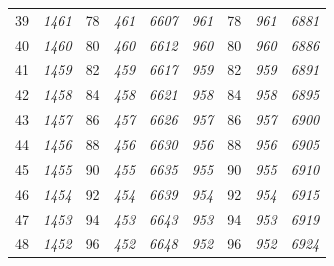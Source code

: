 \documentclass[10pt,fleqn]{article}
\begin{document}
\begin{longtable}{c|cccccccc}
39 & {\color{blue} \it 1461 \rm} & {\color{black} 78} & {\color{blue} \it 461 \rm} & {\color{blue} \it 6607 \rm} & {\color{blue} \it 961 \rm} & {\color{black} 78} & {\color{blue} \it 961 \rm} & {\color{blue} \it 6881 \rm} \\
40 & {\color{blue} \it 1460 \rm} & {\color{black} 80} & {\color{blue} \it 460 \rm} & {\color{blue} \it 6612 \rm} & {\color{blue} \it 960 \rm} & {\color{black} 80} & {\color{blue} \it 960 \rm} & {\color{blue} \it 6886 \rm} \\
41 & {\color{blue} \it 1459 \rm} & {\color{black} 82} & {\color{blue} \it 459 \rm} & {\color{blue} \it 6617 \rm} & {\color{blue} \it 959 \rm} & {\color{black} 82} & {\color{blue} \it 959 \rm} & {\color{blue} \it 6891 \rm} \\
42 & {\color{blue} \it 1458 \rm} & {\color{black} 84} & {\color{blue} \it 458 \rm} & {\color{blue} \it 6621 \rm} & {\color{blue} \it 958 \rm} & {\color{black} 84} & {\color{blue} \it 958 \rm} & {\color{blue} \it 6895 \rm} \\
43 & {\color{blue} \it 1457 \rm} & {\color{black} 86} & {\color{blue} \it 457 \rm} & {\color{blue} \it 6626 \rm} & {\color{blue} \it 957 \rm} & {\color{black} 86} & {\color{blue} \it 957 \rm} & {\color{blue} \it 6900 \rm} \\
44 & {\color{blue} \it 1456 \rm} & {\color{black} 88} & {\color{blue} \it 456 \rm} & {\color{blue} \it 6630 \rm} & {\color{blue} \it 956 \rm} & {\color{black} 88} & {\color{blue} \it 956 \rm} & {\color{blue} \it 6905 \rm} \\
45 & {\color{blue} \it 1455 \rm} & {\color{black} 90} & {\color{blue} \it 455 \rm} & {\color{blue} \it 6635 \rm} & {\color{blue} \it 955 \rm} & {\color{black} 90} & {\color{blue} \it 955 \rm} & {\color{blue} \it 6910 \rm} \\
46 & {\color{blue} \it 1454 \rm} & {\color{black} 92} & {\color{blue} \it 454 \rm} & {\color{blue} \it 6639 \rm} & {\color{blue} \it 954 \rm} & {\color{black} 92} & {\color{blue} \it 954 \rm} & {\color{blue} \it 6915 \rm} \\
47 & {\color{blue} \it 1453 \rm} & {\color{black} 94} & {\color{blue} \it 453 \rm} & {\color{blue} \it 6643 \rm} & {\color{blue} \it 953 \rm} & {\color{black} 94} & {\color{blue} \it 953 \rm} & {\color{blue} \it 6919 \rm} \\
48 & {\color{blue} \it 1452 \rm} & {\color{black} 96} & {\color{blue} \it 452 \rm} & {\color{blue} \it 6648 \rm} & {\color{blue} \it 952 \rm} & {\color{black} 96} & {\color{blue} \it 952 \rm} & {\color{blue} \it 6924 \rm} \\

\end{longtable}
\end{document}
